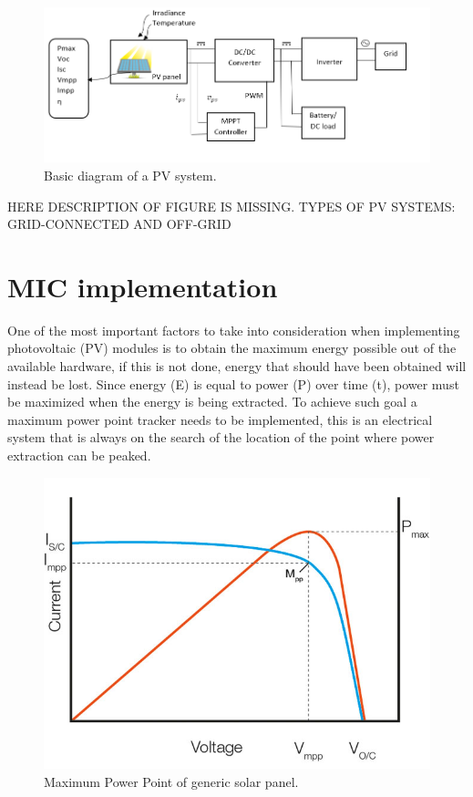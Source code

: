 \begin{figure}[htbp]
	\includegraphics[width=\linewidth]{../Pictures/PV_system_blocks}
	\caption{Basic diagram of a PV system.}
	\label{fig:PVsystemblocks}
\end{figure}

HERE DESCRIPTION OF FIGURE IS MISSING. TYPES OF PV SYSTEMS: GRID-CONNECTED AND OFF-GRID
\newpage

\section{MIC implementation}
One of the most important factors to take into consideration when implementing photovoltaic (PV) modules is to obtain the maximum energy possible out of the available hardware, if this is not done, energy that should have been obtained will instead be lost. Since energy (E) is equal to power (P) over time (t), power must be maximized when the energy is being extracted. To achieve such goal a maximum power point tracker needs to be implemented, this is an electrical system that is always on the search of the location of the point where power extraction can be peaked. 
\begin{figure}[htbp]
	\begin{center}
	\includegraphics[width=0.7\linewidth]{../Pictures/mpp_graph.jpg}
	\caption{Maximum Power Point of generic solar panel.}
	\label{fig:mpp}
	\end{center}
\end{figure}

